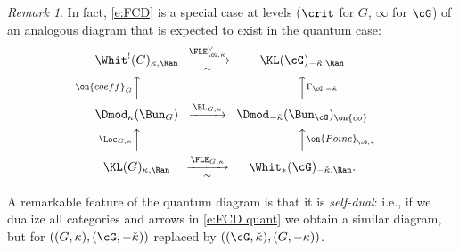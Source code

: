 \documentclass[9pt]{amsart}
\theoremstyle{remark}
\newtheorem{rem}[subsubsection]{Remark}
\theoremstyle{definition}
\theoremstyle{remark}
\numberwithin{equation}{section}
\begin{document}
\begin{rem} 

In fact, \eqref{e:FCD} is a special case at levels ($\crit$ for $G$, $\infty$ for $\cG$) of an analogous diagram that
is expected to exist in the quantum case:
\begin{equation} \label{e:FCD quant}
\CD
\Whit^!(G)_{\kappa,\Ran} @>{\FLE_{\cG,\check\kappa}^\vee}>{\sim}> \KL(\cG)_{-\check\kappa,\Ran} \\
@A{\on{coeff}_G}AA  @AA{\Gamma_{\cG,-\check\kappa}}A \\ 
\Dmod_\kappa(\Bun_G) @>{\BL_{G,\kappa}}>> \Dmod_{-\check\kappa}(\Bun_\cG)_{\on{co}} \\
@A{\Loc_{G,\kappa}}AA  @AA{\on{Poinc}_{\cG,*}}A \\
\KL(G)_{\kappa,\Ran}  @>{\FLE_{G,\kappa}}>{\sim}>  \Whit_*(\cG)_{-\check\kappa,\Ran}.
\endCD
\end{equation} 

A remarkable feature of the quantum diagram is that it is \emph{self-dual}: i.e., if we dualize all categories
and arrows in \eqref{e:FCD quant} we obtain a similar diagram, but for $((G,\kappa),(\cG,-\check\kappa))$ replaced by
$((\cG,\check\kappa),(G,-\kappa))$. 

\end{rem} 

\sssec{}
\end{document}
